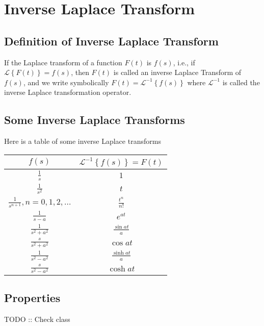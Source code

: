 \documentclass[12pt,class=book,crop=false]{standalone}
\newcommand{\lap}[1]{\mathcal{L}\left\{ #1\right\}}
\newcommand{\ilap}[1]{\mathcal{L}^{-1}\left\{ #1\right\}}
\begin{document}
\chapter{Inverse Laplace Transform}
\section{Definition of Inverse Laplace Transform}
If the Laplace transform of a function $ F(t) $ is $ f(s) $, i.e., if $ \lap{F(t)}=f(s) $, then $ F(t) $ is called an inverse Laplace Transform of $ f(s) $, and we write symbolically $ F(t)=\ilap{f(s)} $ where $ \mathcal{L}^{-1} $ is called the inverse Laplace transformation operator.
\section{Some Inverse Laplace Transforms}
Here is a table of some inverse Laplace transforms
\begin{table}[H]
    \centering
    \begingroup
    \setlength{\tabcolsep}{10pt}
    \renewcommand{\arraystretch}{1.9}
    \begin{tabular}{|c|c|}
        \hline
        $ f(s) $                                         & $ \ilap{f(s)}=F(t) $               \\\hline
        $\displaystyle \frac{1}{s} $                     & $\displaystyle 1$                  \\\hline
        $\displaystyle \frac{1}{s^2} $                   & $\displaystyle t$                  \\\hline
        $\displaystyle \frac{1}{s^{n+1}},n=0,1,2,\dots $ & $\displaystyle \frac{t^n}{n!}$     \\\hline
        $\displaystyle \frac{1}{s-a} $                   & $\displaystyle e^{at}$             \\\hline
        $\displaystyle \frac{1}{s^2+a^2} $               & $\displaystyle \frac{\sin at}{a}$  \\\hline
        $\displaystyle \frac{s}{s^2+a^2} $               & $\displaystyle \cos at$            \\\hline
        $\displaystyle \frac{1}{s^2-a^2} $               & $\displaystyle \frac{\sinh at}{a}$ \\\hline
        $\displaystyle \frac{s}{s^2-a^2} $               & $\displaystyle \cosh at$           \\\hline
    \end{tabular}
    \endgroup
\end{table}
\section{Properties}
TODO :: Check class
\end{document}
